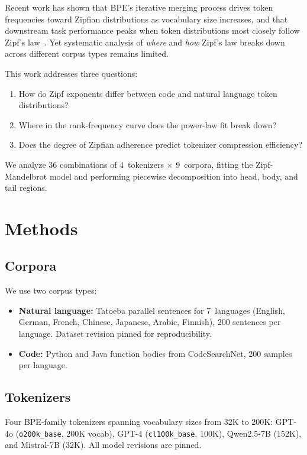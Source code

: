 \documentclass[11pt]{article}
\begin{document}
Recent work has shown that BPE's iterative merging process drives token frequencies toward Zipfian distributions as vocabulary size increases, and that downstream task performance peaks when token distributions most closely follow Zipf's law~\cite{zipf2025}.
Yet systematic analysis of \emph{where} and \emph{how} Zipf's law breaks down across different corpus types remains limited.

This work addresses three questions:
\begin{enumerate}
  \item How do Zipf exponents differ between code and natural language token distributions?
  \item Where in the rank-frequency curve does the power-law fit break down?
  \item Does the degree of Zipfian adherence predict tokenizer compression efficiency?
\end{enumerate}

We analyze 36 combinations of 4~tokenizers $\times$ 9~corpora, fitting the Zipf-Mandelbrot model and performing piecewise decomposition into head, body, and tail regions.

\section{Methods}

\subsection{Corpora}

We use two corpus types:
\begin{itemize}
  \item \textbf{Natural language:} Tatoeba parallel sentences for 7~languages (English, German, French, Chinese, Japanese, Arabic, Finnish), 200 sentences per language.
  Dataset revision pinned for reproducibility.
  \item \textbf{Code:} Python and Java function bodies from CodeSearchNet, 200 samples per language.
\end{itemize}

\subsection{Tokenizers}

Four BPE-family tokenizers spanning vocabulary sizes from 32K to 200K:
GPT-4o (\texttt{o200k\_base}, 200K vocab),
GPT-4 (\texttt{cl100k\_base}, 100K),
Qwen2.5-7B (152K),
and Mistral-7B (32K).
All model revisions are pinned.
\end{document}
